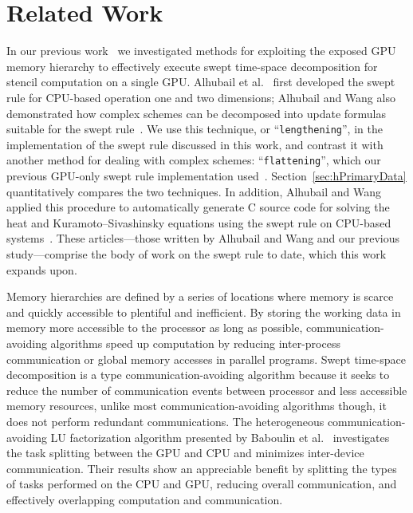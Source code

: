 
\section{Related Work} \label{sec:hRwork}

In our previous work~\cite{OurJCP} we investigated methods for exploiting the exposed GPU memory
hierarchy to effectively execute swept time-space decomposition for stencil computation on a single GPU.
Alhubail et al.~\cite{MaithamRepo, alhubail:16jcp, Alhubail:2016arxiv} first developed
the swept rule for CPU-based operation one and two dimensions; Alhubail and Wang also demonstrated
how complex schemes can be decomposed into update formulas suitable for the swept rule~\cite{WangDecomp}.
We use this technique, or ``\texttt{lengthening}'', in the implementation of the swept rule discussed in this work,
and contrast it with another method for dealing with complex schemes:
``\texttt{flattening}'', which our previous GPU-only swept rule implementation used~\cite{OurJCP}.
Section~\ref{sec:hPrimaryData} quantitatively compares the two techniques.
In addition, Alhubail and Wang applied this procedure to automatically generate C source code for
solving the heat and Kuramoto--Sivashinsky equations using the swept rule on CPU-based systems~\cite{AIAAWang}.
These articles---those written by Alhubail and Wang and our previous study---comprise the body of work
on the swept rule to date, which this work expands upon.

Memory hierarchies are defined by a series of locations where memory is scarce and quickly accessible to plentiful and inefficient.
By storing the working data in memory more accessible to the processor as long as possible, communication-avoiding algorithms speed up computation by reducing inter-process communication or global memory accesses in parallel programs.
Swept time-space decomposition is a type communication-avoiding algorithm because it seeks to reduce the number of communication events between processor and less accessible memory resources, unlike most communication-avoiding algorithms though, it does not perform redundant communications.
The heterogeneous communication-avoiding LU factorization algorithm presented by Baboulin et al.~\cite{BABOULIN201217} investigates the task splitting between the GPU and CPU and minimizes inter-device communication.
Their results show an appreciable benefit by splitting the types of tasks performed on the CPU and GPU, reducing overall communication, and effectively overlapping computation and communication.

